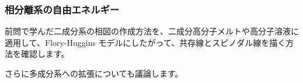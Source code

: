 \documentclass[uplatex,dvipdfmx,a4paper,11pt]{jsarticle}
\newcommand{\difp}[2]{\dfrac{\partial #1}{\partial #2}}
\begin{document}
\begin{enumerate}
%
%
%
%
%
%
%
%



\end{enumerate}

\color{black}

\newpage


\subsubsection{相分離系の自由エネルギー}

\begin{boxnote}
前問で学んだ二成分系の相図の作成方法を、二成分高分子メルトや高分子溶液に適用して、Flory-Huggins モデルにしたがって、共存線とスピノダル線を描く方法を確認します。

さらに多成分系への拡張についても議論します。

\end{boxnote}
\end{document}
